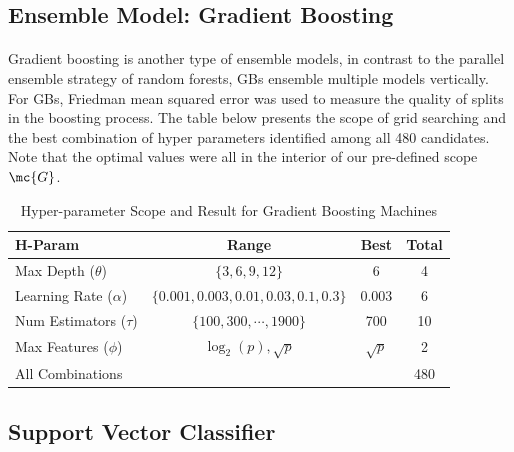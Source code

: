 \documentclass[11pt]{article}
\begin{document}
 	\subsection{Ensemble Model: Gradient Boosting}
 	\paragraph{} Gradient boosting is another type of ensemble models, in contrast to the parallel ensemble strategy of random forests, GBs ensemble multiple models vertically. For GBs, Friedman mean squared error was used to measure the quality of splits in the boosting process. The table below presents the scope of grid searching and the best combination of hyper parameters identified among all 480 candidates. Note that the optimal values were all in the interior of our pre-defined scope $\mc{G}$.
 	\begin{table}
 		\centering
 		\begin{tabular}{l|c|c|c}
 		H-Param & Range & Best & Total \\
 		\hline
 		Max Depth ($\theta$) & $\{3, 6, 9, 12\}$ & 6 & 4 \\
 		Learning Rate ($\alpha$) & $\{0.001, 0.003, 0.01, 0.03, 0.1, 0.3\}$ & 0.003 & 6 \\
 		Num Estimators ($\tau$) & $\{100, 300, \cdots, 1900\}$ & 700 & 10 \\
 		Max Features ($\phi$) & $\log_2(p), \sqrt{p}$& $\sqrt{p}$ & 2\\
 		\hline
 		All Combinations & & & 480
 		\end{tabular}
 		\caption{Hyper-parameter Scope and Result for Gradient Boosting Machines}
 	\end{table}
 	
 	\subsection{Support Vector Classifier}
\end{document}
